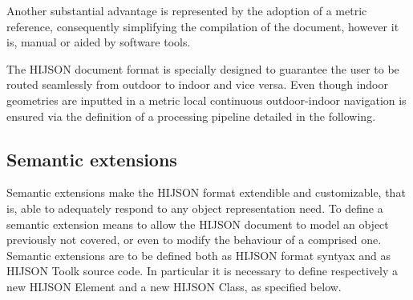 Another substantial advantage is represented by the adoption of a metric reference, 
consequently simplifying the compilation of the document, however it is, 
manual or aided by software tools.

The HIJSON document format is specially designed to guarantee the user to be routed seamlessly 
from outdoor to indoor and vice versa. Even though indoor geometries are inputted in a metric 
local continuous outdoor-indoor navigation is ensured via the definition of a processing pipeline
detailed in the following.

\subsection{Semantic extensions}\label{semantic-extensions}

Semantic extensions make the HIJSON format extendible and customizable, that
is, able to adequately respond to any object representation need. To define a
semantic extension means to allow the HIJSON document to model an object
previously not covered, or even to modify the behaviour of a comprised one.
Semantic extensions are to be defined both as HIJSON format syntyax and as
HIJSON Toolk source code. In particular it is necessary to define respectively
a new HIJSON Element and a new HIJSON Class, as specified below.

